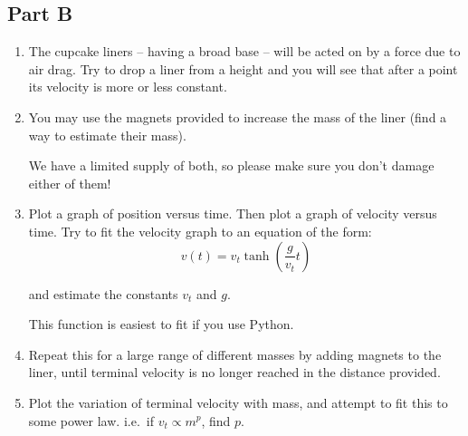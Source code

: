  

\subsection*{Part B}

\begin{enumerate}
    \item The cupcake liners -- having a broad base -- will be acted on by a force due to air drag. Try to drop a liner from a height and you will see that after a point its velocity is more or less constant.
    
    \item You may use the magnets provided to increase the mass of the liner (find a way to estimate their mass).
    
    \begin{imp}
        We have a limited supply of both, so please make sure you don't damage either of them!
    \end{imp}
    
    \item Plot a graph of position versus time. Then plot a graph of velocity versus time. Try to fit the velocity graph to an equation of the form:
    \begin{equation}
        v(t) = v_t \tanh{\left(\frac{g}{v_t} t\right)}
    \end{equation}

    and estimate the constants $v_t$ and $g$.
    \begin{tip}
        This function is easiest to fit if you use Python.
    \end{tip}
    
    \item Repeat this for a large range of different masses by adding magnets to the liner, until terminal velocity is no longer reached in the distance provided. 
    
    \item Plot the variation of terminal velocity with mass, and attempt to fit this to some power law. i.e.\ if $v_t \propto m^p$, find $p$.
\end{enumerate}